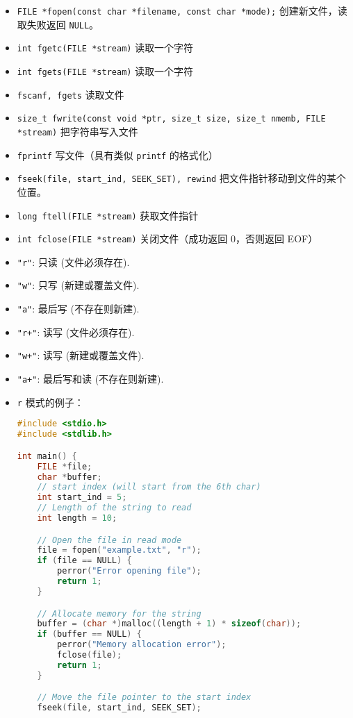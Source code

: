 
\begin{itemize}
\item \verb`FILE *fopen(const char *filename, const char *mode);` 创建新文件，读取失败返回 \verb`NULL`。
\item \verb`int fgetc(FILE *stream)` 读取一个字符
\item \verb`int fgets(FILE *stream)` 读取一个字符
\item \verb`fscanf, fgets` 读取文件
\item \verb`size_t fwrite(const void *ptr, size_t size, size_t nmemb, FILE *stream)` 把字符串写入文件
\item \verb`fprintf` 写文件（具有类似 \verb`printf` 的格式化）
\item \verb`fseek(file, start_ind, SEEK_SET), rewind` 把文件指针移动到文件的某个位置。
\item \verb`long ftell(FILE *stream)` 获取文件指针
\item \verb`int fclose(FILE *stream)` 关闭文件（成功返回 0，否则返回 EOF）
\item \verb`"r"`: 只读 (文件必须存在).
\item \verb`"w"`: 只写 (新建或覆盖文件).
\item \verb`"a"`: 最后写 (不存在则新建).
\item \verb`"r+"`: 读写 (文件必须存在).
\item \verb`"w+"`: 读写 (新建或覆盖文件).
\item \verb`"a+"`: 最后写和读 (不存在则新建).
\item \verb`r` 模式的例子：
\begin{lstlisting}[language=cpp]
#include <stdio.h>
#include <stdlib.h>

int main() {
    FILE *file;
    char *buffer;
    // start index (will start from the 6th char)
    int start_ind = 5;
    // Length of the string to read
    int length = 10;

    // Open the file in read mode
    file = fopen("example.txt", "r");
    if (file == NULL) {
        perror("Error opening file");
        return 1;
    }

    // Allocate memory for the string
    buffer = (char *)malloc((length + 1) * sizeof(char));
    if (buffer == NULL) {
        perror("Memory allocation error");
        fclose(file);
        return 1;
    }

    // Move the file pointer to the start index
    fseek(file, start_ind, SEEK_SET);


\end{lstlisting}
\end{itemize}
